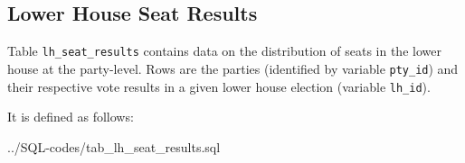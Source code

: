 \subsection{Lower House Seat Results}\label{subsec_tab_lh_seat_results}
Table \texttt{\footnotesize lh\_seat\_results} contains data on the distribution of seats in the lower house at the party-level. 
Rows are the parties (identified by variable \texttt{\footnotesize pty\_id}) and their respective vote results in a given lower house election (variable \texttt{\footnotesize lh\_id}).


It is defined as follows: 

%
{../SQL-codes/tab_lh_seat_results.sql}

